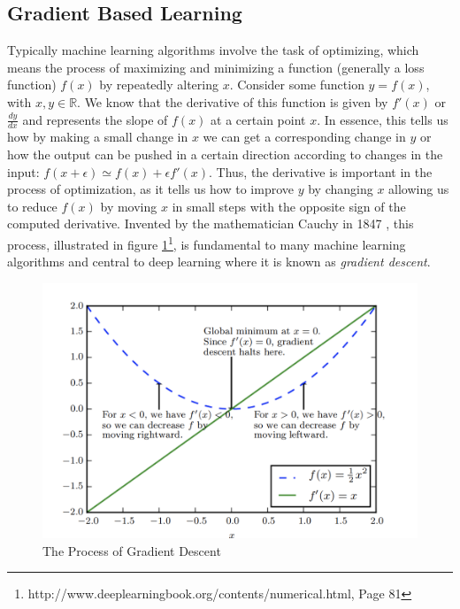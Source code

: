 \documentclass[14pt]{extarticle}
\numberwithin{equation}{section}
\begin{document}
	\subsection{Gradient Based Learning}		
	Typically machine learning algorithms involve the task of optimizing, which means the process of maximizing and minimizing a function (generally a loss function) $f(x)$ by repeatedly altering $x$\cite{Goodfellow-et-al-2016}.
	Consider some function $y = f(x)$, with $x, y \in \mathbb{R}$. We know that the derivative of this function is given by $f'(x) $ or $\frac{dy}{dx}$ and represents the slope of $f(x)$ at a certain point $x$. In essence, this tells us how by making a small change in $x$ we can get a corresponding change in $y$ or how the output can be pushed in a certain direction according to changes in the input: $f(x + \epsilon) \simeq f(x) + \epsilon f'(x)$.  Thus, the derivative is important in the process of optimization, as it tells us how to improve $y$ by changing $x$ allowing us to reduce $f(x)$ by moving $x$ in small steps with the opposite sign of the computed derivative. Invented by the mathematician Cauchy in 1847 \cite{cauchy1847methode}, this process, illustrated in figure \ref{grad_descent}\footnote{http://www.deeplearningbook.org/contents/numerical.html, Page 81}, is fundamental to many machine learning algorithms and central to deep learning where it is known as \textit{gradient descent}.
	\begin{figure}[h]
		\vspace{0.2cm}
		\centering
		\includegraphics[scale=0.8]{grad_descent}
		\caption{The Process of Gradient Descent\cite{Goodfellow-et-al-2016}
			\label{grad_descent}}
	\end{figure}
	\pagebreak
\end{document}
